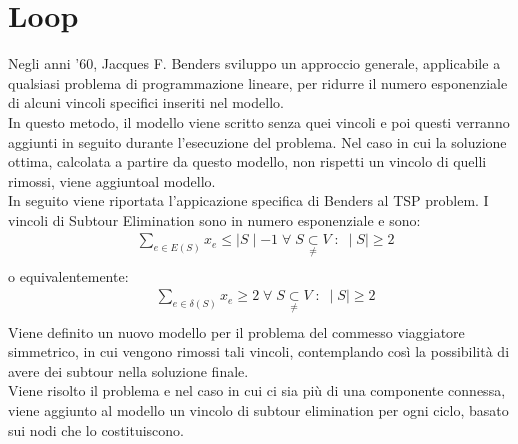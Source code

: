 \section{Loop}
Negli anni '60, Jacques F. Benders sviluppo un approccio generale, applicabile a qualsiasi problema di programmazione lineare, per ridurre il numero esponenziale di alcuni vincoli specifici inseriti nel modello.\\
In questo metodo, il modello viene scritto senza quei vincoli e poi questi verranno aggiunti in seguito durante l'esecuzione del problema. Nel caso in cui la soluzione ottima, calcolata a partire da questo modello, non rispetti un vincolo di quelli rimossi, viene aggiuntoal modello. \\
In seguito viene riportata l'appicazione specifica di Benders al TSP problem.
I vincoli di Subtour Elimination sono in numero esponenziale e sono:\\
\begin{align}
&\underset{e\in E(S)}\sum{x_{e}} \leq \mid S\mid - 1\;\forall\;S\underset{\neq}{\subset}V\; : \; \mid S\mid\geq 2\\
\end{align}
o equivalentemente:
\begin{align}
&\underset{e\in \delta(S)}\sum{x_{e}}\geq 2\;\forall\;S\underset{\neq}{\subset}V\; : \; \mid S\mid\geq 2\\
\end{align}
Viene definito un nuovo modello per il problema del commesso viaggiatore simmetrico, in cui vengono rimossi tali vincoli, contemplando così la possibilità di avere dei subtour nella soluzione finale.\\
Viene risolto il problema e nel caso in cui ci sia più di una componente connessa, viene aggiunto al modello un vincolo di subtour elimination per ogni ciclo, basato sui nodi che lo costituiscono.\\

